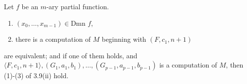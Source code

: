 Let $f$ be an $m$-ary partial function.

\begin{enumerate}
\item[(i)] $(x_0, \ldots, x_{m-1}) \in \text{Dmn } f$,
\item[(ii)] there is a computation of $M$ beginning with $(F, c_1, n+1)$
\end{enumerate}

are equivalent; and if one of them holds, and $\langle F, c_1, n+1 \rangle, (G_1, a_1, b_1), \ldots, (G_{p-1}, a_{p-1}, b_{p-1})$ is a computation of $M$, then (1)-(3) of 3.9(ii) hold.
